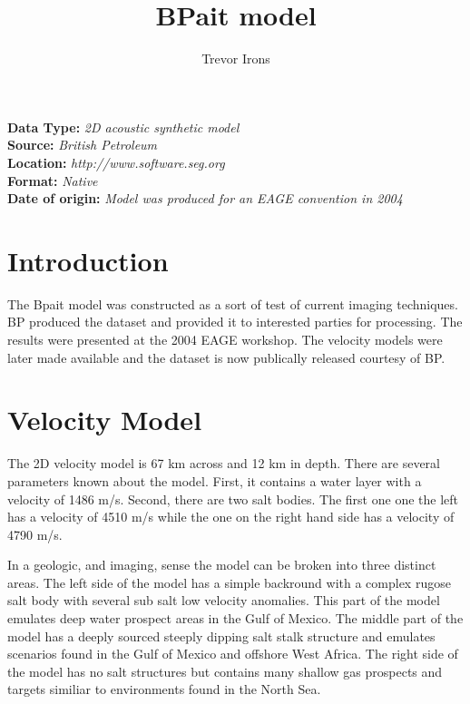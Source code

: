 \title{BPait model}
\author{Trevor Irons}
\maketitle
\lstset{language=python,numbers=left,numberstyle=\tiny,showstringspaces=false}

\noindent
\textbf {Data Type:} \emph{2D acoustic synthetic model}\\
\textbf {Source:} \emph{British Petroleum}\\
\textbf {Location:} \emph{http://www.software.seg.org}\\
\textbf {Format:} \emph{Native} \\
\textbf{Date of origin:} \emph{Model was produced for an EAGE convention in 2004}\\

\section{Introduction}
The Bpait model was constructed as a sort of test of current imaging techniques.  BP produced the dataset and provided it to interested parties for processing.  The results were presented at the 2004 EAGE workshop.  The velocity models were later made available and the dataset is now publically released courtesy of BP.  

{
\tiny

\normalsize
}

\section{Velocity Model}
The 2D velocity model is 67 km across and 12 km in depth. There are several parameters known about the model.  
First, it contains a water layer with a velocity of 1486 m/s.  Second, there are two salt bodies.  
The first one one the left has a velocity of 4510 m/s while the one on the right hand side has a velocity of 4790 m/s.  

In a geologic, and imaging, sense the model can be broken into three distinct areas.  
The left side of the model has a simple backround with a complex rugose salt body with several sub salt 
low velocity anomalies.  This part of the model emulates deep water prospect areas in the Gulf of Mexico.  The middle part of the model has a deeply sourced steeply dipping salt stalk structure and emulates scenarios found in the Gulf of Mexico and offshore West Africa.  The right side of the model has no salt structures but contains many shallow gas prospects and targets similiar to environments found in the North Sea.        

